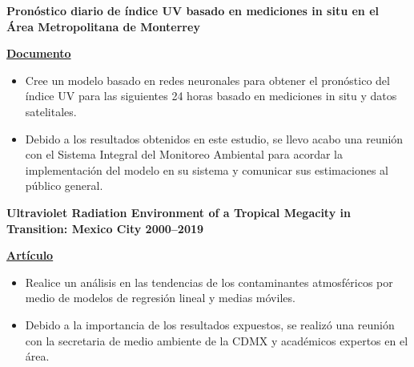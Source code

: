 \documentclass[a3paper]{adcv_color}
\newcommand{\proyect}[5]{\begin{minipage}{1\linewidth}
		\begin{minipage}{1\linewidth}
			\textbf{#1}
		\end{minipage}
	\end{minipage}
	\href{#4}{\textbf{#5}}
	\vspace{-1cm}\\
}
\begin{document}
\proyect{Pronóstico diario de índice UV basado en mediciones in situ en el Área Metropolitana de Monterrey}{Octubre 2023}{-0.8}{https://raw.githubusercontent.com/giovannilopez9808/Documents/master/Tesis/main.pdf}{Documento}
\begin{itemize}
	\setlength\itemsep{0em}
	\item Cree un modelo basado en redes neuronales para obtener el pronóstico del índice UV para las siguientes 24 horas basado en mediciones in situ y datos satelitales.
	\item Debido a los resultados obtenidos en este estudio, se llevo acabo una reunión con el Sistema Integral del Monitoreo Ambiental para acordar la implementación del modelo en su sistema y comunicar sus estimaciones al público general.
\end{itemize}
\proyect{Ultraviolet Radiation Environment of a Tropical Megacity in Transition: Mexico City 2000–2019}{Agosto 2021}{-0.6}{https://pubs.acs.org/doi/10.1021/acs.est.0c08515}{Artículo}
\begin{itemize}
	\setlength\itemsep{0em}
	\item Realice un análisis en las tendencias de los contaminantes atmosféricos por medio de modelos de regresión lineal y medias móviles.
	\item Debido a la importancia de los resultados expuestos, se realizó una reunión con la secretaria de medio ambiente de la CDMX y académicos expertos en el área.
\end{itemize}
\end{document}
